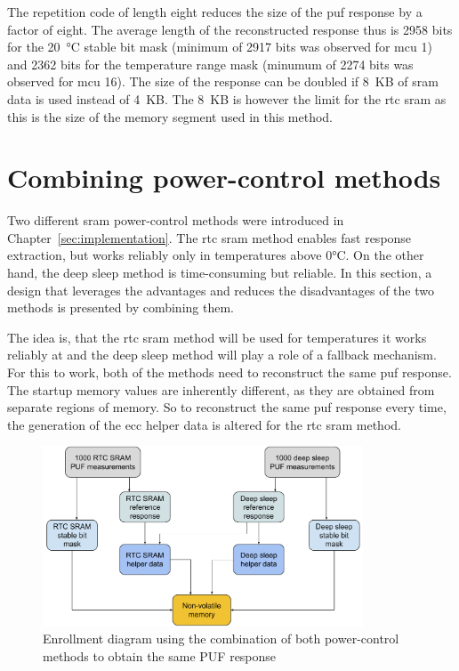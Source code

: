 The repetition code of length eight reduces the size of the \gls{puf} response by a factor of eight. The average length of the reconstructed response thus is 2958 bits for the 20~°C stable bit mask (minimum of 2917 bits was observed for \gls{mcu} 1) and 2362 bits for the temperature range mask (minumum of 2274 bits was observed for \gls{mcu} 16). The size of the response can be doubled if 8~KB of \gls{sram} data is used instead of 4~KB. The 8~KB is however the limit for the \gls{rtc} \gls{sram} as this is the size of the memory segment used in this method.

\section{Combining power-control methods}

Two different \gls{sram} power-control methods were introduced in Chapter~\ref{sec:implementation}. The \gls{rtc} \gls{sram} method enables fast response extraction, but works reliably only in temperatures above 0°C. On the other hand, the deep sleep method is time-consuming but reliable. In this section, a design that leverages the advantages and reduces the disadvantages of the two methods is presented by combining them.

The idea is, that the \gls{rtc} \gls{sram} method will be used for temperatures it works reliably at and the deep sleep method will play a role of a fallback mechanism. For this to work, both of the methods need to reconstruct the same \gls{puf} response. The startup memory values are inherently different, as they are obtained from separate regions of memory. So to reconstruct the same \gls{puf} response every time, the generation of the \gls{ecc} helper data is altered for the \gls{rtc} \gls{sram} method.

\begin{figure}[ht!]
    \centering
    \captionsetup{justification=centering,margin=0.5cm}
    \includegraphics[width=0.85\textwidth]{images/enrollment_diagram.pdf}
    \caption{Enrollment diagram using the combination of both power-control methods to obtain the same PUF response}
    \label{fig:enrollment_diagram}
\end{figure}

